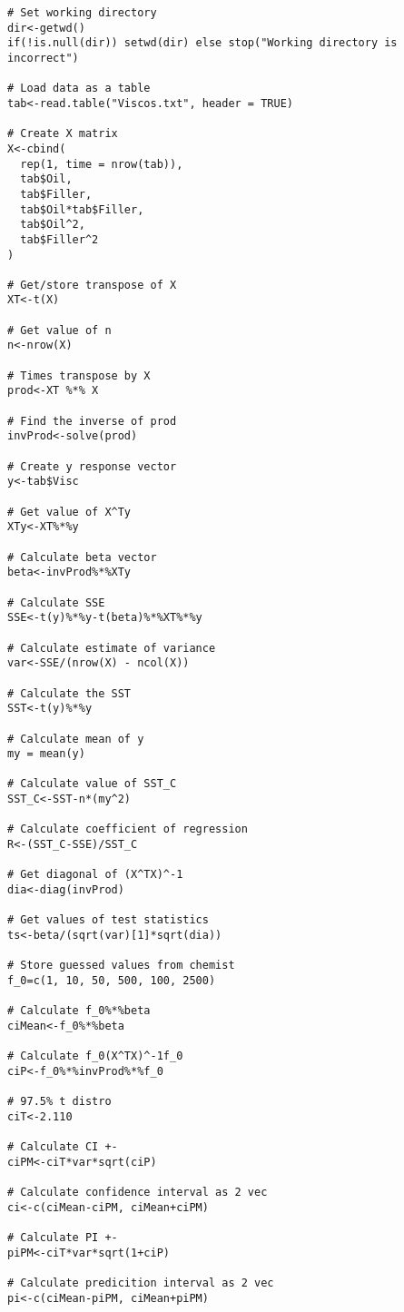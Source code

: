 \documentclass[12pt]{article}
\begin{document}
\begin{lstlisting}[caption={Quadratic regression equation method},label={quad_code}]
# Set working directory
dir<-getwd()
if(!is.null(dir)) setwd(dir) else stop("Working directory is incorrect")

# Load data as a table
tab<-read.table("Viscos.txt", header = TRUE)

# Create X matrix
X<-cbind(
  rep(1, time = nrow(tab)),
  tab$Oil,
  tab$Filler,
  tab$Oil*tab$Filler,
  tab$Oil^2,
  tab$Filler^2
)

# Get/store transpose of X
XT<-t(X)

# Get value of n
n<-nrow(X)

# Times transpose by X
prod<-XT %*% X

# Find the inverse of prod
invProd<-solve(prod)

# Create y response vector
y<-tab$Visc

# Get value of X^Ty
XTy<-XT%*%y

# Calculate beta vector
beta<-invProd%*%XTy

# Calculate SSE
SSE<-t(y)%*%y-t(beta)%*%XT%*%y

# Calculate estimate of variance
var<-SSE/(nrow(X) - ncol(X))

# Calculate the SST
SST<-t(y)%*%y

# Calculate mean of y
my = mean(y)

# Calculate value of SST_C
SST_C<-SST-n*(my^2)

# Calculate coefficient of regression
R<-(SST_C-SSE)/SST_C

# Get diagonal of (X^TX)^-1
dia<-diag(invProd)

# Get values of test statistics
ts<-beta/(sqrt(var)[1]*sqrt(dia))

# Store guessed values from chemist
f_0=c(1, 10, 50, 500, 100, 2500)

# Calculate f_0%*%beta
ciMean<-f_0%*%beta

# Calculate f_0(X^TX)^-1f_0
ciP<-f_0%*%invProd%*%f_0

# 97.5% t distro
ciT<-2.110

# Calculate CI +-
ciPM<-ciT*var*sqrt(ciP)

# Calculate confidence interval as 2 vec
ci<-c(ciMean-ciPM, ciMean+ciPM)

# Calculate PI +-
piPM<-ciT*var*sqrt(1+ciP)

# Calculate predicition interval as 2 vec
pi<-c(ciMean-piPM, ciMean+piPM)
\end{lstlisting}
\end{document}
